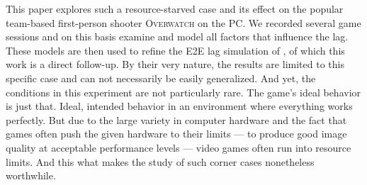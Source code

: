 This paper explores such a resource-starved case and its effect on the popular team-based first-person shooter \textsc{Overwatch} on the PC. We recorded several game sessions and on this basis examine and model all factors that influence the lag. These models are then used to refine the \gls{E2E} lag simulation of \cite{Metzger+2016}, of which this work is a direct follow-up. By their very nature, the results are limited to this specific case and can not necessarily be easily generalized. And yet, the conditions in this experiment are not particularly rare. The game's ideal behavior is just that. Ideal, intended behavior in an environment where everything works perfectly. But due to the large variety in computer hardware and the fact that games often push the given hardware to their limits --- to produce good image quality at acceptable performance levels --- video games often run into resource limits. And this what makes the study of such corner cases nonetheless worthwhile.



